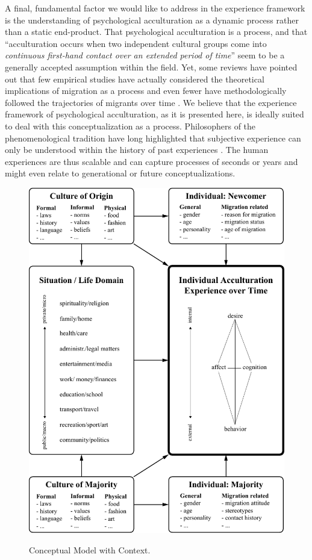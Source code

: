 \documentclass[man, 12pt, a4paper]{apa7}
\begin{document}
A final, fundamental factor we would like to address in the experience framework is the understanding of psychological acculturation as a dynamic process rather than a static end-product. That psychological acculturation is a process, and that ``acculturation occurs when two independent cultural groups come into \textit{continuous first-hand contact over an extended period of time}'' \citep[][186]{Berry1989} seem to be a generally accepted assumption within the field. Yet, some reviews have pointed out that few empirical studies have actually considered the theoretical implications of migration as a process and even fewer have methodologically followed the trajectories of migrants over time \citep[][]{Brown2011, Ward2019}. We believe that the experience framework of psychological acculturation, as it is presented here, is ideally suited to deal with this conceptualization as a process. Philosophers of the phenomenological tradition have long highlighted that subjective experience can only be understood within the history of past experiences \citep[e.g.,][]{Heidegger1867}. The human experiences are thus scalable and can capture processes of seconds or years and might even relate to generational or future conceptualizations.

\begin{figure}[h]
\centering
\caption{Conceptual Model with Context.}
\includegraphics[width=\textwidth]{Figures/ConceptualFrameworkStatic.pdf}
\label{fig:ModelContext}
\end{figure}
\end{document}

